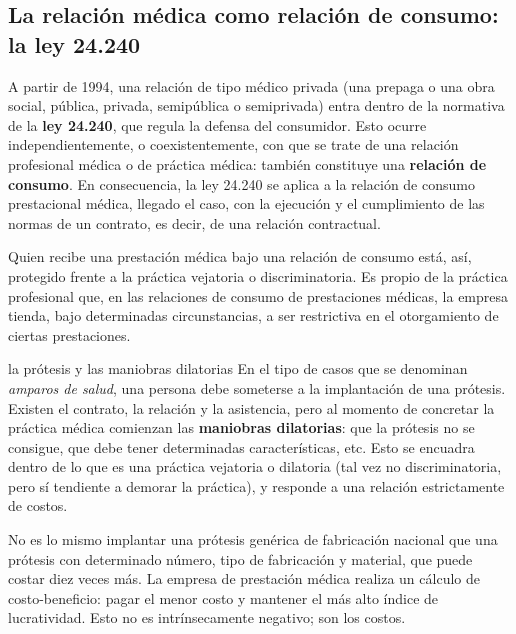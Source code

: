 \documentclass[12pt,oneside]{book}
\begin{document}
\subsection{La relaci\'on m\'edica como relaci\'on de consumo: la ley 24.240}

A partir de 1994, una relaci\'on de tipo m\'edico privada (una prepaga o una obra social, p\'ublica, privada, semip\'ublica o semiprivada) entra dentro de la normativa de la \textbf{ley 24.240}, que regula la defensa del consumidor. Esto ocurre independientemente, o coexistentemente, con que se trate de una relaci\'on profesional m\'edica o de pr\'actica m\'edica: tambi\'en constituye una \textbf{relaci\'on de consumo}. En consecuencia, la ley 24.240 se aplica a la relaci\'on de consumo prestacional m\'edica, llegado el caso, con la ejecuci\'on y el cumplimiento de las normas de un contrato, es decir, de una relaci\'on contractual.

Quien recibe una prestaci\'on m\'edica bajo una relaci\'on de consumo est\'a, as\'i, protegido frente a la pr\'actica vejatoria o discriminatoria. Es propio de la pr\'actica profesional que, en las relaciones de consumo de prestaciones m\'edicas, la empresa tienda, bajo determinadas circunstancias, a ser restrictiva en el otorgamiento de ciertas prestaciones.

\begin{example}{la pr\'otesis y las maniobras dilatorias}
En el tipo de casos que se denominan \emph{amparos de salud}, una persona debe someterse a la implantaci\'on de una pr\'otesis. Existen el contrato, la relaci\'on y la asistencia, pero al momento de concretar la pr\'actica m\'edica comienzan las \textbf{maniobras dilatorias}: que la pr\'otesis no se consigue, que debe tener determinadas caracter\'isticas, etc. Esto se encuadra dentro de lo que es una pr\'actica vejatoria o dilatoria (tal vez no discriminatoria, pero s\'i tendiente a demorar la pr\'actica), y responde a una relaci\'on estrictamente de costos.

No es lo mismo implantar una pr\'otesis gen\'erica de fabricaci\'on nacional que una pr\'otesis con determinado n\'umero, tipo de fabricaci\'on y material, que puede costar diez veces m\'as. La empresa de prestaci\'on m\'edica realiza un c\'alculo de costo-beneficio: pagar el menor costo y mantener el m\'as alto \'indice de lucratividad. Esto no es intr\'insecamente negativo; son los costos.%
\end{example}
\end{document}

